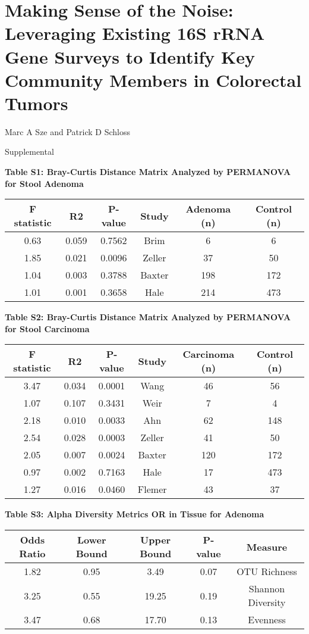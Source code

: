 \documentclass[12pt,]{article}
\title{}
\author{}
\date{}
\begin{document}
\section{Making Sense of the Noise: Leveraging Existing 16S rRNA Gene
Surveys to Identify Key Community Members in Colorectal
Tumors}\label{making-sense-of-the-noise-leveraging-existing-16s-rrna-gene-surveys-to-identify-key-community-members-in-colorectal-tumors}

\vspace{10mm}

\begin{center}
Marc A Sze and Patrick D Schloss

\vspace{10mm}

Supplemental
\end{center}

\newpage

\textbf{Table S1: Bray-Curtis Distance Matrix Analyzed by PERMANOVA for
Stool Adenoma}

\begin{longtable}[]{@{}cccccc@{}}
\toprule
F statistic & R2 & P-value & Study & Adenoma (n) & Control
(n)\tabularnewline
\midrule
\endhead
0.63 & 0.059 & 0.7562 & Brim & 6 & 6\tabularnewline
1.85 & 0.021 & 0.0096 & Zeller & 37 & 50\tabularnewline
1.04 & 0.003 & 0.3788 & Baxter & 198 & 172\tabularnewline
1.01 & 0.001 & 0.3658 & Hale & 214 & 473\tabularnewline
\bottomrule
\end{longtable}

\newpage

\textbf{Table S2: Bray-Curtis Distance Matrix Analyzed by PERMANOVA for
Stool Carcinoma}

\begin{longtable}[]{@{}cccccc@{}}
\toprule
F statistic & R2 & P-value & Study & Carcinoma (n) & Control
(n)\tabularnewline
\midrule
\endhead
3.47 & 0.034 & 0.0001 & Wang & 46 & 56\tabularnewline
1.07 & 0.107 & 0.3431 & Weir & 7 & 4\tabularnewline
2.18 & 0.010 & 0.0033 & Ahn & 62 & 148\tabularnewline
2.54 & 0.028 & 0.0003 & Zeller & 41 & 50\tabularnewline
2.05 & 0.007 & 0.0024 & Baxter & 120 & 172\tabularnewline
0.97 & 0.002 & 0.7163 & Hale & 17 & 473\tabularnewline
1.27 & 0.016 & 0.0460 & Flemer & 43 & 37\tabularnewline
\bottomrule
\end{longtable}

\newpage

\textbf{Table S3: Alpha Diversity Metrics OR in Tissue for Adenoma}

\begin{longtable}[]{@{}ccccc@{}}
\toprule
Odds Ratio & Lower Bound & Upper Bound & P-value &
Measure\tabularnewline
\midrule
\endhead
1.82 & 0.95 & 3.49 & 0.07 & OTU Richness\tabularnewline
3.25 & 0.55 & 19.25 & 0.19 & Shannon Diversity\tabularnewline
3.47 & 0.68 & 17.70 & 0.13 & Evenness\tabularnewline
\bottomrule
\end{longtable}
\end{document}
